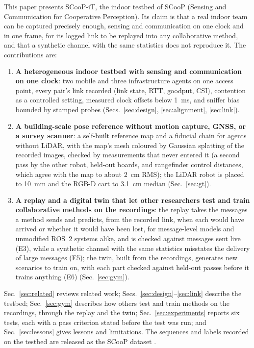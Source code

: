 This paper presents SCooP-iT, the indoor testbed of SCooP (Sensing and
Communication for Cooperative Perception). Its claim is that a real
indoor team can be captured precisely enough, sensing and communication
on one clock and in one frame, for its logged link to be replayed into
any collaborative method, and that a synthetic channel with the same
statistics does not reproduce it. The
contributions are:
\begin{enumerate}
    \item \textbf{A heterogeneous indoor testbed with sensing and
    communication on one clock}: two mobile and three infrastructure
    agents on one access point, every pair's link recorded (link state,
    RTT, goodput, CSI), contention as a controlled setting, measured
    clock offsets below \SI{1}{\milli\second}, and sniffer bias bounded
    by stamped probes (Secs.~\ref{sec:design}, \ref{sec:alignment},
    \ref{sec:link}).
    \item \textbf{A building-scale pose reference without motion capture,
    GNSS, or a survey scanner}: a self-built reference map and a fiducial
    chain for agents without LiDAR, with the map's mesh coloured by
    Gaussian splatting of the recorded images, checked by measurements
    that never entered it (a second pass by the other robot, held-out boards, and
    rangefinder control distances, which agree with the map to about
    \SI{2}{\centi\metre} RMS); the LiDAR robot is placed to
    \SI{10}{\milli\metre} and the RGB-D cart to \SI{3.1}{\centi\metre}
    median (Sec.~\ref{sec:gt}).
    \item \textbf{A replay and a digital twin that let other researchers
    test and train collaborative methods on the recordings}: the replay
    takes the messages a method sends and predicts, from the recorded
    link, when each would have arrived or whether it would have been
    lost, for message-level models and unmodified ROS~2 systems alike,
    and is checked against messages sent live 
    (E3), while a synthetic channel with the same statistics misstates
    the delivery of large messages (E5); the twin, built from the
    recordings, generates new scenarios to train on, with each part
    checked against held-out passes before it trains anything (E6)
    (Sec.~\ref{sec:gym}).
\end{enumerate}
Sec.~\ref{sec:related} reviews related work;
Secs.~\ref{sec:design}--\ref{sec:link} describe the testbed;
Sec.~\ref{sec:gym} describes how others test and train methods on the
recordings, through the replay and the twin; Sec.~\ref{sec:experiments}
reports six tests, each with a pass criterion stated before the test was
run; and Sec.~\ref{sec:lessons}
gives lessons and limitations. The sequences and labels recorded on the
testbed are released as the SCooP dataset \cite{scoop_dataset}.
